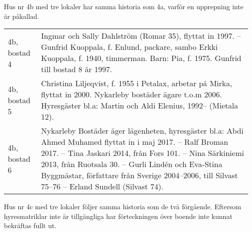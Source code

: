 
Hus nr 4b med tre lokaler har samma historia som 4a, varför en upprepning inte är påkallad.\jhvspace{}

\begin{center}
  \begin{longtable}{l p{}}
    \hline
    4b, bostad 4 & Ingmar och Sally Dahlström (Romar 35), flyttat in 1997. -- Gunfrid Kuoppala, f. Enlund, packare, sambo Erkki Kuoppala, f. 1940, timmerman. Barn: Pia, f. 1975. Gunfrid till bostad 8 år 1997. \\
    4b, bostad 5 & Christina Liljeqvist, f. 1955 i Petalax, arbetar på Mirka, flyttat in 2000. Nykarleby bostäder ägare t.o.m 2006. Hyresgäster bl.a: Martin och Aldi Elenius, 1992--\allowbreak 1999 (Mietala 12). \\
    4b, bostad 6 & Nykarleby Bostäder äger lägenheten, hyresgäster bl.a: Abdi Ahmed Muhamed flyttat in i maj 2017. -- Ralf Broman 2017. -- Tina Jaskari 2014, från Fors 101. -- Nina Särkiniemi 2013, från Ruotsala 30. -- Gurli Lindén och Eva-Stina Byggmästar, författare från Sverige 2004--2006, till Silvast 75--76 -- Erland Sundell (Silvast 74). \\
    \hline
  \end{longtable}
\end{center}



Hus nr 4c med tre lokaler följer samma historia som de två förgående. Eftersom hyresmatriklar inte är tillgängliga har förteckningen över boende inte kunnat bekräftas fullt ut.\jhvspace{}

